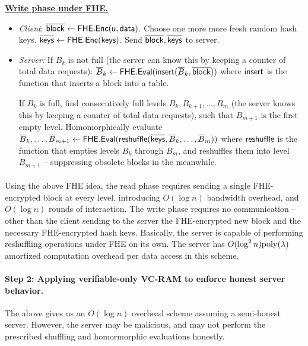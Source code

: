 \noindent\begin{boxedminipage}{\textwidth}
\underline{{\bf Write phase under FHE.}}
\begin{itemize}
\item
{\it Client}: 
$\overline{{\sf block}} \leftarrow \mathsf{FHE}.{\sf Enc}(\textsf{u}, {\sf data})$.
Choose one more more fresh random hash keys.
$\overline{{\sf keys}} \leftarrow \mathsf{FHE}.{\sf Enc}({\sf keys})$.
Send $\overline{{\sf block}}, \overline{{\sf keys}}$ to server. 
\item
{\it Server:}
If $B_k$ is not full (the server can know this by keeping
a counter of total data requests):
$\overline{B}_k \leftarrow 
\mathsf{FHE}.\textsf{Eval}({\sf insert}(\overline{B}_k, \overline{{\sf block}}))$
where ${\sf insert}$ is the function that
inserts a block into a table. 

If $B_k$ is full, find consecutively full levels
$B_k, B_{k+1}, \ldots, B_{m}$ (the server knows this by keeping
a counter of total data requests), such that $B_{m+1}$ is the first
empty level.
Homomorphically evaluate 
$\overline{B}_k, \ldots, \overline{B}_{m+1} \leftarrow 
\mathsf{FHE}.\textsf{Eval}({\sf reshuffle}(\overline{{\sf keys}}, \overline{B}_k, \ldots, \overline{B}_m))$ 
where ${\sf reshuffle}$
is the function that 
empties levels $B_k$ through $B_m$, and reshuffles them into level
$B_{m+1}$ -- suppressing obsolete blocks in the meanwhile.
\end{itemize}
\end{boxedminipage}

\paragraph{}
Using the above FHE idea, the read phase requires sending a single
FHE-encrypted block at every level, introducing $O(\log n)$ bandwidth
overhead, and $O(\log n)$ rounds of interaction.
The write phase requires no communication -- other than the client
sending to the server the FHE-encrypted new block and the necessary
FHE-encrypted hash keys. Basically, the server
is capable of performing reshuffling operations 
under FHE on its own.
The server has $O(\log^2 n) {\rm poly}(\lambda)$  
amortized computation overhead per data access 
in this scheme.



\paragraph{Step 2: Applying verifiable-only VC-RAM to enforce
honest server behavior.}
The above gives us 
an $O(\log n)$ overhead \nameshort scheme assuming a semi-honest server. 
However, the server may be malicious, and may not perform
the prescribed shuffling and homormorphic evaluations honestly. 

